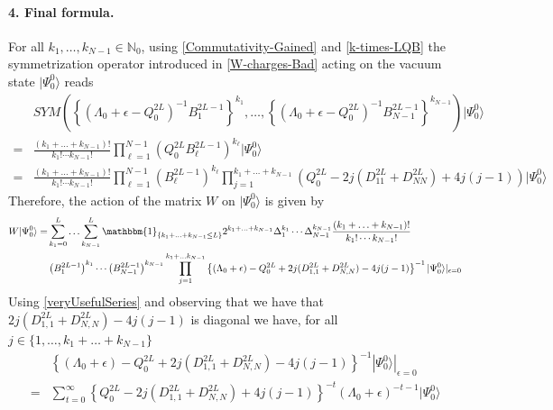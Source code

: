 \documentclass[10pt]{article}
\numberwithin{equation}{section}
\numberwithin{equation}{subsection}
\begin{document}
\paragraph{4. Final formula.} For all $k_{1},\ldots,k_{N-1}\in\mathbb{N}_{0}$, using \eqref{Commutativity-Gained} and \eqref{k-times-LQB} the symmetrization operator introduced in \eqref{W-charges-Bad} acting on the vacuum state $|\Psi_{0}^{0}\rangle$ reads
\begin{align}
	&SYM\left(\left\{\left(\Lambda_{0}+\epsilon-Q_{0}^{2L}\right)^{-1}B_{1}^{2L-1}\right\}^{k_{1}},\ldots,\left\{\left(\Lambda_{0}+\epsilon-Q_{0}^{2L}\right)^{-1}B_{N-1}^{2L-1}\right\}^{k_{N-1}}\right)
	|\Psi_{0}^{0}\rangle\nonumber
	\\=&\frac{	(k_{1}+\ldots+k_{N-1})!}{k_{1}!\cdots k_{N-1}!}	\prod_{\ell=1}^{N-1}\left(Q_{0}^{2L}B_{\ell}^{2L-1}\right)^{k_{\ell}}|\Psi_{0}^{0}\rangle\nonumber
	\\=&\frac{	(k_{1}+\ldots+k_{N-1})!}{k_{1}!\cdots k_{N-1}!}\prod_{\ell=1}^{N-1}\left(B_{\ell}^{2L-1}\right)^{k_{\ell}}\prod_{j=1}^{k_{1}+\ldots+k_{N-1}}\left(Q_{0}^{2L}-2j(D_{11}^{2L}+D_{NN}^{2L})+4j(j-1)\right)|\Psi_{0}^{0}\rangle
\end{align}
Therefore, the action of the matrix $W$ on $|\Psi_{0}^{0}\rangle$ is given by
\begin{equation}\label{intermediate-W-ss}
	\begin{split}
		W|\Psi_{0}^{0}\rangle =&\sum_{k_{1}=0}^{L}\ldots\sum_{k_{N-1}}^{L}\mathbbm{1}_{\{k_{1}+\ldots+k_{N-1}\leq L\}}2^{k_{1}+\ldots+k_{N-1}}\Delta_{1}^{k_{1}}\cdots \Delta_{N-1}^{k_{N-1}}\frac{	(k_{1}+\ldots+k_{N-1})!}{k_{1}!\cdots k_{N-1}!}\\&
		\left(B_{1}^{2L-1}\right)^{k_{1}}\cdots\left( B_{N-1}^{2L-1}\right)^{k_{N-1}}\prod_{j=1}^{k_{1}+\ldots k_{N-1}}\left\{(\Lambda_{0}+\epsilon)-Q_{0}^{2L}+2j(D_{1,1}^{2L}+D_{N,N}^{2L})-4j(j-1)\right\}^{-1}|\Psi_{0}^{0}\rangle|_{\epsilon=0}
	\end{split}
\end{equation}
Using \eqref{veryUsefulSeries} and observing that  we have that $2j(D_{1,1}^{2L}+D_{N,N}^{2L})-4j(j-1)$ is diagonal we have, for all $j\in\{1,\ldots,k_{1}+\ldots+k_{N-1}\}$ 
\begin{align}
&\left\{(\Lambda_{0}+\epsilon)-Q_{0}^{2L}+2j(D_{1,1}^{2L}+D_{N,N}^{2L})-4j(j-1)\right\}^{-1}|\Psi_{0}^{0}\rangle|_{\epsilon=0}\nonumber\\=&
\sum_{t=0}^{\infty}\left\{Q_{0}^{2L}-2j(D_{1,1}^{2L}+D_{N,N}^{2L})+4j(j-1)\right\}^{-t}\left(\Lambda_{0}+\epsilon\right)^{-t-1}|\Psi_{0}^{0}\rangle
\end{align}
\end{document}
